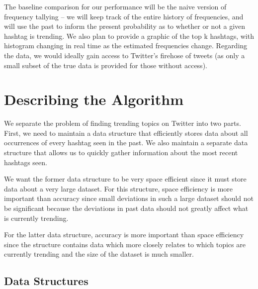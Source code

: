 \documentclass[twoside]{article}
\begin{document}
The baseline comparison for our performance will be the naive version of frequency tallying -- we will keep track of the entire history of frequencies, and will use the past to inform the present probability as to whether or not a given hashtag is trending. We also plan to provide a graphic of the top k hashtags, with histogram changing in real time as the estimated frequencies change. Regarding the data, we would ideally gain access to Twitter's firehose of tweets (as only a small subset of the true data is provided for those without access). 

\section{Describing the Algorithm}


We separate the problem of finding trending topics on Twitter into two parts.  First, we need to maintain a data structure that efficiently stores data about all occurrences of every hashtag seen in the past.  We also maintain a separate data structure that allows us to quickly gather information about the most recent hashtags seen.

We want the former data structure to be very space efficient since it must store data about a very large dataset.  For this structure, space efficiency is more important than accuracy since small deviations in such a large dataset should not be significant because the deviations in past data should not greatly affect what is currently trending.

For the latter data structure, accuracy is more important than space efficiency since the structure contains data which more closely relates to which topics are currently trending and the size of the dataset is much smaller.


\subsection{Data Structures}
\end{document}
